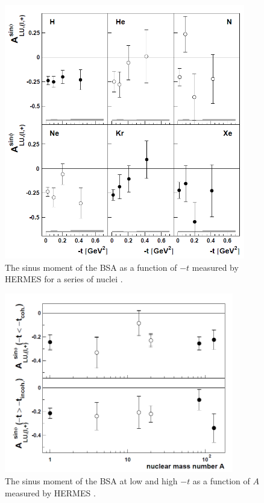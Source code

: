 \documentclass{article}
\begin{document}
\begin{figure}[tbp!]
\center
	\includegraphics[width=10.5cm]{fig3/HERMES_BSA.png}
	\caption{The sinus moment of the BSA as a function of $-t$ measured by HERMES
	for a series of nuclei \cite{Airapetian:2009cga}.}
\label{fig:HERMES1}
\end{figure}

\begin{figure}[tbp!]
\center
\includegraphics[width=10cm]{fig3/HERMES_BSA_2.png}
\caption{The sinus moment of the BSA at low and high $-t$ as a function of $A$ measured by HERMES
	\cite{Airapetian:2009cga}.}
\label{fig:HERMES2}
\end{figure}
\end{document}
